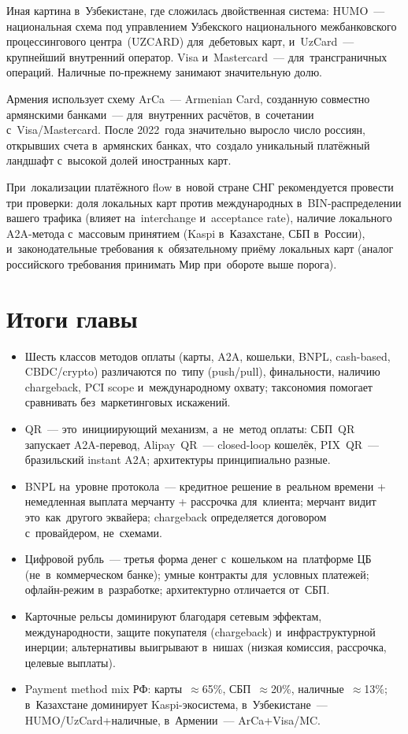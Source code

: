 Иная картина в~Узбекистане, где сложилась двойственная система: HUMO~--- национальная
схема под управлением Узбекского национального межбанковского процессингового
центра~(UZCARD) для~дебетовых карт, и~UzCard~--- крупнейший внутренний
оператор. Visa и~Mastercard~--- для~трансграничных операций. Наличные
по-прежнему занимают значительную долю.

Армения использует схему ArCa~--- Armenian Card, созданную
совместно армянскими банками~--- для~внутренних расчётов, в~сочетании
с~Visa/Mastercard. После 2022~года значительно выросло число россиян,
открывших счета в~армянских банках, что~создало уникальный платёжный
ландшафт с~высокой долей иностранных карт.

\begin{practice}
  При~локализации платёжного flow в~новой стране СНГ рекомендуется
  провести три проверки: доля локальных карт против международных в~BIN-распределении
  вашего трафика (влияет на~interchange и~acceptance rate), наличие локального
  A2A-метода с~массовым принятием (Kaspi в~Казахстане, СБП в~России),
  и~законодательные требования к~обязательному приёму локальных карт
  (аналог российского требования принимать Мир при~обороте выше порога).
\end{practice}


\section*{Итоги главы}

\begin{itemize}
  \item Шесть классов методов оплаты (карты, A2A, кошельки, BNPL,
        cash-based, CBDC/crypto) различаются по~типу (push/pull),
        финальности, наличию chargeback, PCI scope и~международному
        охвату; таксономия помогает сравнивать без~маркетинговых
        искажений.
  \item QR~--- это~инициирующий механизм, а~не~метод оплаты: СБП~QR
        запускает A2A-перевод, Alipay~QR~--- closed-loop кошелёк,
        PIX~QR~--- бразильский instant A2A; архитектуры принципиально
        разные.
  \item BNPL на~уровне протокола~--- кредитное решение в~реальном времени
        + немедленная выплата мерчанту + рассрочка для~клиента;
        мерчант видит это~как~другого эквайера; chargeback определяется
        договором с~провайдером, не~схемами.
  \item Цифровой рубль~--- третья форма денег с~кошельком на~платформе
        ЦБ (не~в~коммерческом банке); умные контракты для~условных
        платежей; офлайн-режим в~разработке; архитектурно отличается
        от~СБП.
  \item Карточные рельсы доминируют благодаря сетевым эффектам,
        международности, защите покупателя (chargeback) и~инфраструктурной
        инерции; альтернативы выигрывают в~нишах (низкая комиссия,
        рассрочка, целевые выплаты).
  \item Payment method mix РФ: карты~$\approx$65\%, СБП~$\approx$20\%,
        наличные~$\approx$13\%; в~Казахстане доминирует Kaspi-экосистема,
        в~Узбекистане~--- HUMO/UzCard+наличные, в~Армении~---
        ArCa+Visa/MC.
\end{itemize}
